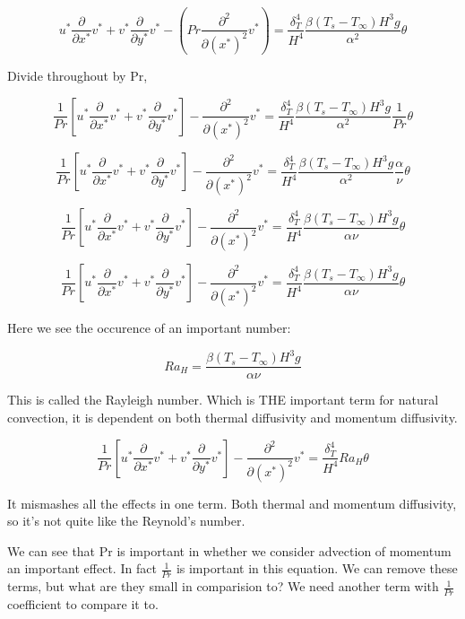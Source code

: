 \documentclass[11pt]{article}
\begin{document}
$$   u^* \frac{\partial}{\partial x^*} v^* +    v^* \frac{\partial}{\partial y^*} v^*  -  ( Pr \frac{\partial^2}{\partial (x^*)^2} v^* ) = \frac{\delta_T^4}{ H^4} \frac{\beta(T_s-T_\infty) H^3 g}{\alpha^2}  \theta $$

Divide throughout by Pr,

$$ \frac{1}{Pr} \left[ u^* \frac{\partial}{\partial x^*} v^* +    v^* \frac{\partial}{\partial y^*} v^* \right] -   \frac{\partial^2}{\partial (x^*)^2} v^*  = \frac{\delta_T^4}{ H^4} \frac{\beta(T_s-T_\infty) H^3 g}{\alpha^2} \frac{1}{Pr} \theta $$

$$ \frac{1}{Pr} \left[ u^* \frac{\partial}{\partial x^*} v^* +    v^* \frac{\partial}{\partial y^*} v^* \right] -   \frac{\partial^2}{\partial (x^*)^2} v^*  = \frac{\delta_T^4}{ H^4} \frac{\beta(T_s-T_\infty) H^3 g}{\alpha^2} \frac{\alpha	}{\nu} \theta $$

$$ \frac{1}{Pr} \left[ u^* \frac{\partial}{\partial x^*} v^* +    v^* \frac{\partial}{\partial y^*} v^* \right] -   \frac{\partial^2}{\partial (x^*)^2} v^*  = \frac{\delta_T^4}{ H^4} \frac{\beta(T_s-T_\infty) H^3 g}{\alpha \nu}  \theta $$

$$ \frac{1}{Pr} \left[ u^* \frac{\partial}{\partial x^*} v^* +    v^* \frac{\partial}{\partial y^*} v^* \right] -   \frac{\partial^2}{\partial (x^*)^2} v^*  = \frac{\delta_T^4}{ H^4} \frac{\beta(T_s-T_\infty) H^3 g}{\alpha \nu}  \theta $$

Here we see the occurence of an important number:

$$Ra_H =  \frac{\beta(T_s-T_\infty) H^3 g}{\alpha \nu}$$



This is called the Rayleigh number. Which is THE important term for natural convection, it is dependent on both thermal diffusivity and momentum diffusivity. 

$$ \frac{1}{Pr} \left[ u^* \frac{\partial}{\partial x^*} v^* +    v^* \frac{\partial}{\partial y^*} v^* \right] -   \frac{\partial^2}{\partial (x^*)^2} v^*  = \frac{\delta_T^4}{ H^4} Ra_H  \theta $$


It mismashes all the effects in one term. Both thermal and momentum diffusivity, so it's not quite like the Reynold's number.

We can see that Pr is important in whether we consider advection of momentum an important effect. In fact $\frac{1}{Pr}$ is important in this equation. We can remove these terms, but what are they small in comparision to? We need another term with $\frac{1}{Pr}$ coefficient to compare it to.
\end{document}
